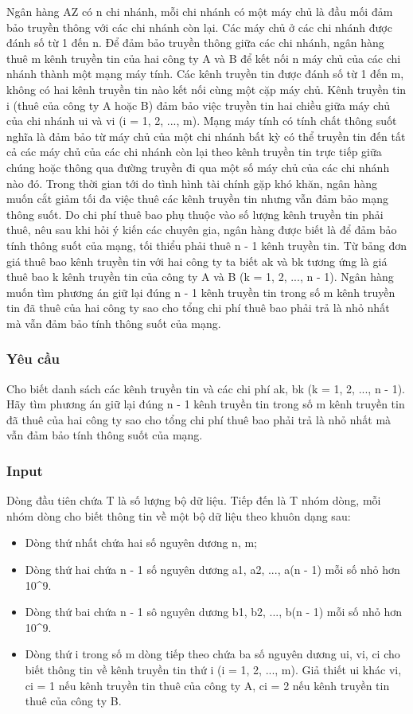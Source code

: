 

Ngân hàng AZ có n chi nhánh, mỗi chi nhánh có một máy chủ là đầu mối đảm bảo truyền thông với các chi nhánh còn lại. Các máy chủ ở các chi nhánh được đánh số từ 1 đến n. Để đảm bảo truyền thông giữa các chi nhánh, ngân hàng thuê m kênh truyền tin của hai công ty A và B để kết nối n máy chủ của các chi nhánh thành một mạng máy tính. Các kênh truyền tin được đánh số từ 1 đến m, không có hai kênh truyền tin nào kết nối cùng một cặp máy chủ. Kênh truyền tin i (thuê của công ty A hoặc B) đảm bảo việc truyền tin hai chiều giữa máy chủ của chi nhánh ui và vi (i = 1, 2, ..., m). Mạng máy tính có tính chất thông suốt nghĩa là đảm bảo từ máy chủ của một chi nhánh bất kỳ có thể truyền tin đến tất cả các máy chủ của các chi nhánh còn lại theo kênh truyền tin trực tiếp giữa chúng hoặc thông qua đường truyền đi qua một số máy chủ của các chi nhánh nào đó. Trong thời gian tới do tình hình tài chính gặp khó khăn, ngân hàng muốn cắt giảm tối đa việc thuê các kênh truyền tin nhưng vẫn đảm bảo mạng thông suốt. Do chi phí thuê bao phụ thuộc vào số lượng kênh truyền tin phải thuê, nêu sau khi hỏi ý kiến các chuyên gia, ngân hàng được biết là để đảm bảo tính thông suốt của mạng, tối thiểu phải thuê n - 1 kênh truyền tin. Từ bảng đơn giá thuê bao kênh truyền tin với hai công ty ta biết ak và bk tương ứng là giá thuê bao k kênh truyền tin của công ty A và B (k = 1, 2, ..., n - 1). Ngân hàng muốn tìm phương án giữ lại đúng n - 1 kênh truyền tin trong số m kênh truyền tin đã thuê của hai công ty sao cho tổng chi phí thuê bao phải trả là nhỏ nhất mà vẫn đảm bảo tính thông suốt của mạng.

\subsubsection{Yêu cầu}

Cho biết danh sách các kênh truyền tin và các chi phí ak, bk (k = 1, 2, ..., n - 1). Hãy tìm phương án giữ lại đúng n - 1 kênh truyền tin trong số m kênh truyền tin đã thuê của hai công ty sao cho tổng chi phí thuê bao phải trả là nhỏ nhất mà vẫn đảm bảo tính thông suốt của mạng.

\subsubsection{Input}

Dòng đầu tiên chứa T là số lượng bộ dữ liệu. Tiếp đến là T nhóm dòng, mỗi nhóm dòng cho biết thông tin về một bộ dữ liệu theo khuôn dạng sau:
\begin{itemize}
	\item Dòng thứ nhất chứa hai số nguyên dương n, m;
	\item Dòng thứ hai chứa n - 1 số nguyên dương a1, a2, ..., a(n - 1) mỗi số nhỏ hơn 10^9.
	\item Dòng thứ bai chứa n - 1 sô nguyên dương b1, b2, ..., b(n - 1) mỗi số nhỏ hơn 10^9.
	\item Dòng thứ i trong số m dòng tiếp theo chứa ba số nguyên dương ui, vi, ci cho biết thông tin về kênh truyền tin thứ i (i = 1, 2, ..., m). Giả thiết ui khác vi, ci = 1 nếu kênh truyền tin thuê của công ty A, ci = 2 nếu kênh truyền tin thuê của công ty B.
\end{itemize}

